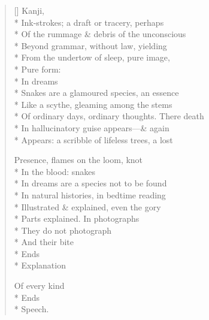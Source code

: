 \begin{verse}[\versewidth]
\hspace{4\vgap} Kanji, \\*
Ink-strokes; a draft or tracery, perhaps\\*
Of the rummage \& debris of the unconscious\\*
Beyond grammar, without law, yielding\\*
From the undertow of sleep, pure image, \\*
Pure form:\\*
\hspace{4\vgap} In dreams\\*
Snakes are a glamoured species, an essence\\*
Like a scythe, gleaming among the stems\\*
Of ordinary days, ordinary thoughts.  There death\\*
In hallucinatory guise appears---\& again\\*
Appears: a scribble of lifeless trees, a lost

Presence, flames on the loom, knot \\*
In the blood: snakes\\*
In dreams are a species not to be found\\*
In natural histories, in bedtime reading\\*
Illustrated \& explained, even the gory \\*
Parts explained.   In photographs\\*
They do not photograph\\*
And their bite\\*
Ends\\*
Explanation

Of every kind\\*
Ends\\*
Speech.
\end{verse}
